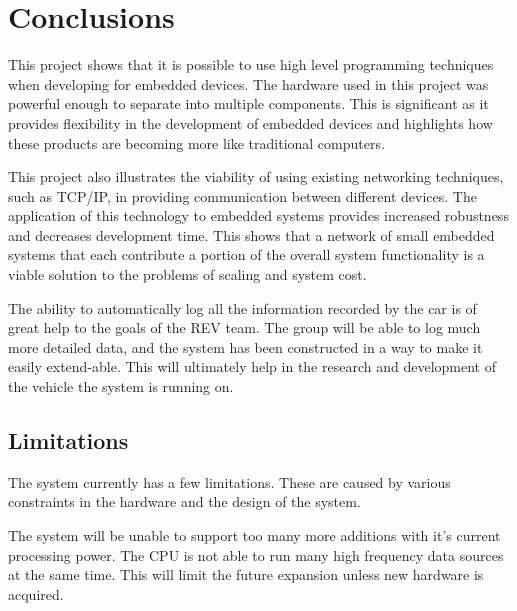 

\chapter{Conclusions} %



\ifpdf
    \graphicspath{{8/figures/PNG/}{8/figures/PDF/}{8/figures/}}
\else
    \graphicspath{{8/figures/EPS/}{8/figures/}}
\fi




This project shows that it is possible to use high level programming techniques when developing for embedded devices. The hardware used in this project was powerful enough to separate into multiple components. This is significant as it provides flexibility in the development of embedded devices and highlights how these products are becoming more like traditional computers.

This project also illustrates the viability of using existing networking techniques, such as TCP/IP, in providing communication between different devices. The application of this technology to embedded systems provides increased robustness and decreases development time.  This shows that a network of small embedded systems that each contribute a portion of the overall system functionality is a viable solution to the problems of scaling and system cost.

The ability to automatically log all the information recorded by the car is of great help to the goals of the REV team. The group will be able to log much more detailed data, and the system has been constructed in a way to make it easily extend-able. This will ultimately help in the research and development of the vehicle the system is running on.

\section{Limitations}

The system currently has a few limitations. These are caused by various constraints in the hardware and the design of the system.

The system will be unable to support too many more additions with it's current processing power. The CPU is not able to run many high frequency data sources at the same time. This will limit the future expansion unless new hardware is acquired.


